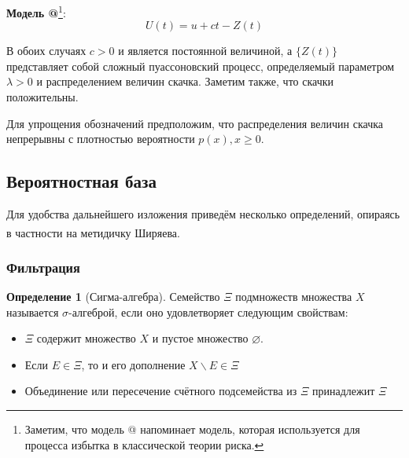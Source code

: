 \documentclass[a4paper,12pt]{article}
\makeatletter
\theoremstyle{definition}
\newtheorem{definition}{Определение}[section]
\newcommand*{\rom}[1]{\expandafter\@slowromancap\romannumeral #1@}
\makeatother
\begin{document}
\textbf{Модель \rom{2}}\footnote{Заметим, что модель \rom{2} напоминает модель, которая используется для процесса избытка в классической теории риска.}: 
\begin{equation}\label{eq:model2_definition}
    U(t) = u + ct - Z(t)
\end{equation}

В обоих случаях $c > 0$ и является постоянной величиной, а $\{Z(t)\}$ представляет собой сложный пуассоновский процесс, определяемый параметром $\lambda > 0$ и распределением величин скачка. Заметим также, что скачки положительны.

\label{sec:positivityOfJumsAssumption} Для упрощения обозначений предположим, что распределения величин скачка
непрерывны с плотностью вероятности $p(x), x \ge 0$. 

\subsection{Вероятностная база}

Для удобства дальнейшего изложения приведём несколько определений, опираясь в частности на метидичку Ширяева\textsuperscript{\cite{bib:Shiryaev_Bulynski}}.

\subsubsection{Фильтрация}

\begin{definition}[Сигма-алгебра]
    \label{def:sigma_algebra}
    Семейство $\Xi$ подмножеств множества $X$ называется $\sigma$-алгеброй, если оно удовлетворяет следующим свойствам:
    
    \begin{itemize}
        \item $\Xi$ содержит множество $X$ и пустое множество $\varnothing$.
        \item Если $E \in \Xi$, то и его дополнение $X \backslash E \in \Xi$
        \item Объединение или пересечение счётного подсемейства из $\Xi$ принадлежит $\Xi$
    \end{itemize}

\end{definition}
\end{document}
